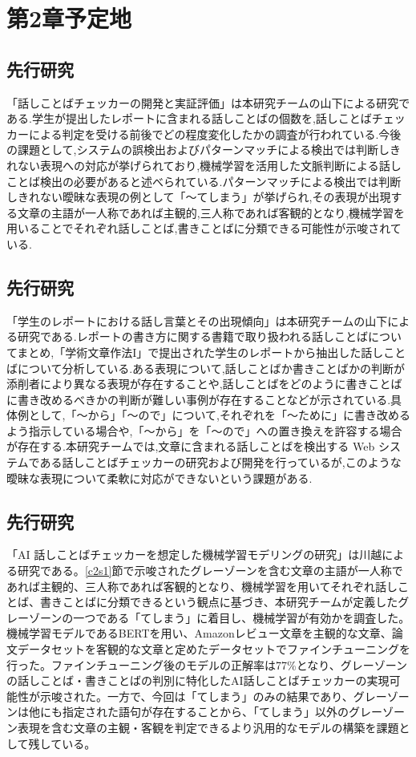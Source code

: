 \chapter{第2章予定地\label{c2}}

\section{先行研究 \label{c2s1}}
「話しことばチェッカーの開発と実証評価」は本研究チームの山下による研究である.学生が提出したレポートに含まれる話しことばの個数を,話しことばチェッカーによる判定を受ける前後でどの程度変化したかの調査が行われている.今後の課題として,システムの誤検出およびパターンマッチによる検出では判断しきれない表現への対応が挙げられており,機械学習を活用した文脈判断による話しことば検出の必要があると述べられている.パターンマッチによる検出では判断しきれない曖昧な表現の例として「～てしまう」が挙げられ,その表現が出現する文章の主語が一人称であれば主観的,三人称であれば客観的となり,機械学習を用いることでそれぞれ話しことば,書きことばに分類できる可能性が示唆されている.

\section{先行研究 \label{c2s2}}
「学生のレポートにおける話し言葉とその出現傾向」は本研究チームの山下による研究である.レポートの書き方に関する書籍で取り扱われる話しことばについてまとめ,「学術文章作法I」で提出された学生のレポートから抽出した話しことばについて分析している.ある表現について,話しことばか書きことばかの判断が添削者により異なる表現が存在することや,話しことばをどのように書きことばに書き改めるべきかの判断が難しい事例が存在することなどが示されている.具体例として,「～から」「～ので」について,それぞれを「～ために」に書き改めるよう指示している場合や,「～から」を「～ので」への置き換えを許容する場合が存在する.本研究チームでは,文章に含まれる話しことばを検出する Web システムである話しことばチェッカーの研究および開発を行っているが,このような曖昧な表現について柔軟に対応ができないという課題がある.

\section{先行研究 \label{c2s3}}
「AI 話しことばチェッカーを想定した機械学習モデリングの研究」は川越による研究である。\ref{c2s1}節で示唆されたグレーゾーンを含む文章の主語が一人称であれば主観的、三人称であれば客観的となり、機械学習を用いてそれぞれ話しことば、書きことばに分類できるという観点に基づき、本研究チームが定義したグレーゾーンの一つである「てしまう」に着目し、機械学習が有効かを調査した。機械学習モデルであるBERTを用い、Amazonレビュー文章を主観的な文章、論文データセットを客観的な文章と定めたデータセットでファインチューニングを行った。ファインチューニング後のモデルの正解率は77\%となり、グレーゾーンの話しことば・書きことばの判別に特化したAI話しことばチェッカーの実現可能性が示唆された。一方で、今回は「てしまう」のみの結果であり、グレーゾーンは他にも指定された語句が存在することから、「てしまう」以外のグレーゾーン表現を含む文章の主観・客観を判定できるより汎用的なモデルの構築を課題として残している。